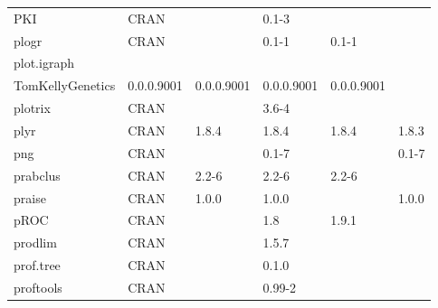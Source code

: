 \begin{longtable}{llllll}
\rowcolor{black!10}
PKI                           & \acrshort{CRAN}                      &             & 0.1-3       &                &                   \\
\rowcolor{black!5}
plogr                         & \acrshort{CRAN}                      &             & 0.1-1       & 0.1-1          &                    \\
\rowcolor{black!10}
plot.igraph                   & \begin{tabular}[c]{@{}l@{}}GitHub \\ TomKellyGenetics \end{tabular}  & 0.0.0.9001  & 0.0.0.9001  & 0.0.0.9001     & 0.0.0.9001        \\
\rowcolor{black!5}
plotrix                       & \acrshort{CRAN}                      &             & 3.6-4       &                &                    \\
\rowcolor{black!10}
plyr                          & \acrshort{CRAN}                      & 1.8.4       & 1.8.4       & 1.8.4          & 1.8.3             \\
\rowcolor{black!5}
png                           & \acrshort{CRAN}                      &             & 0.1-7       &                & 0.1-7              \\
\rowcolor{black!10}
prabclus                      & \acrshort{CRAN}                      & 2.2-6       & 2.2-6       & 2.2-6          &                   \\
\rowcolor{black!5}
praise                        & \acrshort{CRAN}                      & 1.0.0       & 1.0.0       &                & 1.0.0              \\
\rowcolor{black!10}
pROC                          & \acrshort{CRAN}                      &             & 1.8         & 1.9.1          &                   \\
\rowcolor{black!5}
prodlim                       & \acrshort{CRAN}                      &             & 1.5.7       &                &                    \\
\rowcolor{black!10}
prof.tree                     & \acrshort{CRAN}                      &             & 0.1.0       &                &                   \\
\rowcolor{black!5}
proftools                     & \acrshort{CRAN}                      &             & 0.99-2      &                &                    \\

\end{longtable}
